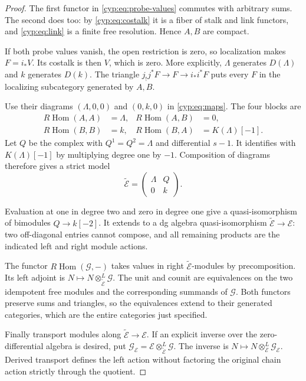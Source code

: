 \begin{proof}
The first functor in \eqref{cyp:eq:probe-values} commutes
with arbitrary sums. The second does too: by
\eqref{cyp:eq:costalk} it is a fiber of stalk and link
functors, and \eqref{cyp:eq:link} is a finite free
resolution. Hence \(A,B\) are compact.

If both probe
values vanish, the open restriction is zero, so localization
makes \(F=i_*V\). Its costalk is then \(V\), which is zero.
More explicitly, \(\Lambda\) generates \(D(\Lambda)\)
and \(k\) generates \(D(k)\). The triangle
\(j_!j^*F\to F\to i_*i^*F\) puts every \(F\) in the
localizing subcategory generated by \(A,B\).

Use their diagrams \((\Lambda,0,0)\) and \((0,k,0)\)
in \eqref{cyp:eq:maps}. The four blocks are
\begin{align*}
 R\operatorname{Hom}(A,A)&=\Lambda,&
 R\operatorname{Hom}(A,B)&=0,\\
 R\operatorname{Hom}(B,B)&=k,&
 R\operatorname{Hom}(B,A)&=K(\Lambda)[-1].
\end{align*}
Let \(Q\) be the complex with \(Q^1=Q^2=\Lambda\)
and differential \(s-1\). It identifies with
\(K(\Lambda)[-1]\) by multiplying degree one by \(-1\).
Composition of diagrams therefore gives a strict model
\[
 \widetilde{\mathcal E}
       =\begin{pmatrix}\Lambda&Q\\0&k\end{pmatrix}.
\]

Evaluation at one in degree two and zero in degree one
give a quasi-isomorphism of bimodules \(Q\to k[-2]\).
It extends to a dg algebra quasi-isomorphism
\(\widetilde{\mathcal E}\to\mathcal E\): two off-diagonal
entries cannot compose, and all remaining products are
the indicated left and right module actions.

The functor \(R\operatorname{Hom}(\mathcal G,-)\) takes
values in right \(\widetilde{\mathcal E}\)-modules by
precomposition. Its left adjoint is
\(N\mapsto N\otimes^L_{\widetilde{\mathcal E}}\mathcal G\).
The unit and counit are equivalences on the two idempotent
free modules and the corresponding summands of
\(\mathcal G\). Both functors preserve sums and triangles,
so the equivalences extend to their generated categories,
which are the entire categories just specified.

Finally transport modules along
\(\widetilde{\mathcal E}\to\mathcal E\). If an explicit
inverse over the zero-differential algebra is desired, put
\(\mathcal G_{\mathcal E}
=\mathcal E\otimes^L_{\widetilde{\mathcal E}}\mathcal G\).
The inverse is
\(N\mapsto N\otimes^L_{\mathcal E}\mathcal G_{\mathcal E}\).
Derived transport defines the left action without factoring
the original chain action strictly through the quotient.
\end{proof}

